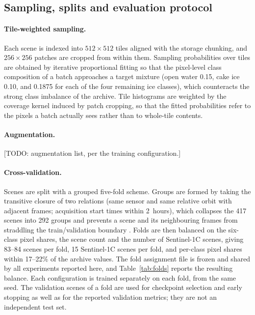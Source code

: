 \documentclass[preprint,12pt,authoryear]{elsarticle}
\begin{document}
\subsection{Sampling, splits and evaluation protocol}
\label{sec:splits}

\paragraph{Tile-weighted sampling.} Each scene is indexed into $512\times512$
tiles aligned with the storage chunking, and $256\times256$ patches are cropped
from within them. Sampling probabilities over tiles are obtained by iterative
proportional fitting \citep{deming1940leastsquares} so that the
pixel-level class composition of a batch approaches a target mixture
(open water 0.15, cake ice 0.10, and 0.1875 for each of the four remaining ice
classes), which counteracts the strong class imbalance of the archive. Tile
histograms are weighted by the coverage kernel induced by patch cropping, so
that the fitted probabilities refer to the pixels a batch actually sees rather
than to whole-tile contents.

\paragraph{Augmentation.} [TODO: augmentation list, per the training
configuration.]

\paragraph{Cross-validation.} Scenes are split with a grouped five-fold scheme.
Groups are formed by taking the transitive closure of two relations (same
sensor and same relative orbit with adjacent frames; acquisition start times
within 2~hours), which collapses the 417 scenes into 292 groups and prevents
a scene and its neighbouring frames from straddling the train/validation
boundary \citep{roberts2017crossvalidation}. Folds are then balanced on the
six-class pixel shares, the scene count and the number of Sentinel-1C scenes,
giving 83--84 scenes per fold, 15 Sentinel-1C scenes per fold, and per-class
pixel shares within 17--22\% of the archive values. The fold assignment file is
frozen and shared by all experiments reported here, and Table~\ref{tab:folds}
reports the resulting balance. Each configuration is trained separately on each
fold, from the same seed. The validation scenes of a fold are used for
checkpoint selection and early stopping as well as for the reported validation
metrics; they are not an independent test set.
\end{document}
